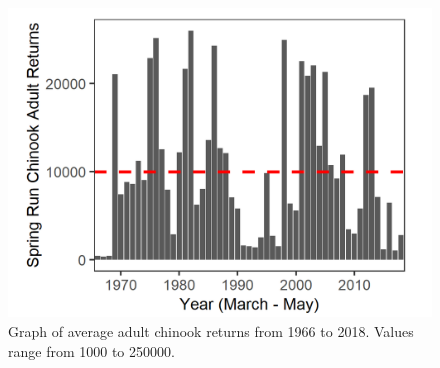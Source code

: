 \documentclass[
]{book}
\begin{document}
\begin{panel-grid}
\begin{columns-nocenter}
\begin{column800}
\begin{expand}
\end{expand}

\end{column800}

\begin{column40}

~

\end{column40}

\begin{column800}

\begin{expand}

\begin{figure}
\includegraphics[width=15.25in]{figures/SpringRun_1966} \caption{Graph of average adult chinook returns from 1966 to 2018. Values range from 1000 to 250000.}\label{fig:unnamed-chunk-36}
\end{figure}

\end{expand}

\end{column800}

\begin{column40}

~

\end{column40}

\begin{column800}

\begin{expand}


\end{expand}
\end{column800}
\end{columns-nocenter}
\end{panel-grid}
\end{document}
